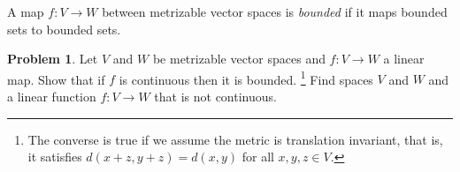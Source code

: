 \documentclass[11pt]{article}
\theoremstyle{definition}
\newtheorem{prob}{Problem}
\begin{document}
A map $f : V \to W$ between metrizable vector spaces is \emph{bounded} if
it maps bounded sets to bounded sets.

\begin{prob}
Let $V$ and $W$ be metrizable vector spaces and $f : V \to W$ a linear map.
Show that if $f$ is continuous then it is bounded.%
\footnote{The converse is true if we assume the metric is translation
invariant, that is, it satisfies $d(x + z, y + z) = d(x,y)$ for all $x,y,z \in
V$.}
Find spaces $V$ and $W$ and a linear function $f : V \to W$ that is not continuous.
\end{prob}
\end{document}
